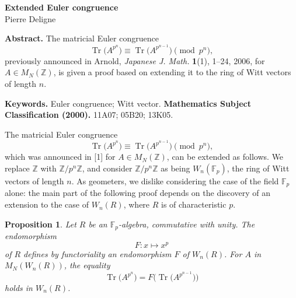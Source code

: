 \documentclass[10pt,a4paper]{article}
\newcommand{\Z}{\mathbb Z}
\newcommand{\F}{\mathbb F}
\newcommand{\Tr}{\operatorname{Tr}}
\newcommand{\MN}{M_N}
\newcommand{\Wn}{W_n}
\theoremstyle{deligne}
\newtheorem*{proposition*}{Proposition}
\begin{document}
\begin{center}
{\Large\bfseries Extended Euler congruence}\\[0.6em]
{\large Pierre Deligne}
\end{center}

\textbf{Abstract.} The matricial Euler congruence
\[
\Tr\bigl(A^{p^n}\bigr)\equiv \Tr\bigl(A^{p^{n-1}}\bigr)\pmod{p^n},
\]
previously announced in Arnold, \textit{Japanese J. Math.} \textbf{1}(1), 1--24, 2006, for \(A\in \MN(\Z)\), is given a proof based on extending it to the ring of Witt vectors of length \(n\).

\textbf{Keywords.} Euler congruence; Witt vector.\quad
\textbf{Mathematics Subject Classification (2000).} 11A07; 05B20; 13K05.

The matricial Euler congruence
\begin{equation}
\tag{1}
\Tr\bigl(A^{p^n}\bigr)\equiv \Tr\bigl(A^{p^{n-1}}\bigr)\pmod{p^n},
\end{equation}
which was announced in [1] for \(A\in \MN(\Z)\), can be extended as follows. We replace \(\Z\) with \(\Z/p^n\Z\), and consider \(\Z/p^n\Z\) as being \(\Wn(\F_p)\), the ring of Witt vectors of length \(n\). As geometers, we dislike considering the case of the field \(\F_p\) alone: the main part of the following proof depends on the discovery of an extension to the case of \(\Wn(R)\), where \(R\) is of characteristic \(p\).

\begin{proposition*}
Let \(R\) be an \(\F_p\)-algebra, commutative with unity. The endomorphism
\[
F:x\longmapsto x^p
\]
of \(R\) defines by functoriality an endomorphism \(F\) of \(\Wn(R)\). For \(A\) in \(\MN(\Wn(R))\), the equality
\begin{equation}
\tag{2}
\Tr\bigl(A^{p^n}\bigr)=F\bigl(\Tr\bigl(A^{p^{n-1}}\bigr)\bigr)
\end{equation}
holds in \(\Wn(R)\).
\end{proposition*}
\end{document}
